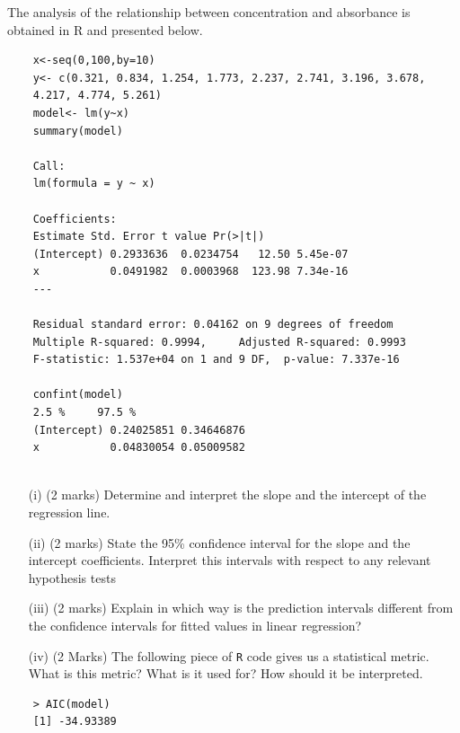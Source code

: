 \documentclass[a4paper,12pt]{article}
\begin{document}
The analysis of the relationship between concentration and absorbance is obtained in R and presented below. 
\begin{framed}
	\begin{verbatim}
	x<-seq(0,100,by=10)
	y<- c(0.321, 0.834, 1.254, 1.773, 2.237, 2.741, 3.196, 3.678, 
	4.217, 4.774, 5.261)
	model<- lm(y~x)
	summary(model)
	
	Call:
	lm(formula = y ~ x)
	
	Coefficients:
	Estimate Std. Error t value Pr(>|t|)    
	(Intercept) 0.2933636  0.0234754   12.50 5.45e-07 
	x           0.0491982  0.0003968  123.98 7.34e-16 
	---
	
	Residual standard error: 0.04162 on 9 degrees of freedom
	Multiple R-squared: 0.9994,     Adjusted R-squared: 0.9993 
	F-statistic: 1.537e+04 on 1 and 9 DF,  p-value: 7.337e-16 
	
	confint(model)
	2.5 %     97.5 %
	(Intercept) 0.24025851 0.34646876
	x           0.04830054 0.05009582
	
	\end{verbatim}
\end{framed}
\newpage
\begin{itemize}
	\item[(i)] (2 marks)
	Determine and interpret the slope and the intercept of the regression line.
	\item[(ii)]  (2 marks) State the 95\% confidence interval for the slope and the intercept coefficients. Interpret this intervals with respect to any relevant hypothesis tests
	\item[(iii)] (2 marks) Explain in which way is the prediction intervals different from the confidence intervals for fitted values in linear regression?
	\item[(iv)] (2 Marks) The following piece of \texttt{R} code gives us a statistical metric. What is this metric? What is it used for? How should it be interpreted.
	
\end{itemize}
\begin{framed}
	\begin{verbatim}
	> AIC(model)
	[1] -34.93389	
	\end{verbatim}
\end{framed}


	
\end{document}
